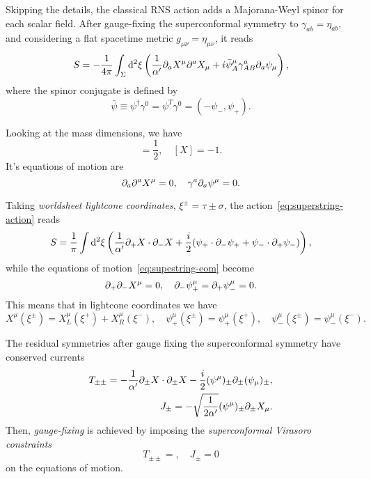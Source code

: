 Skipping the details, the classical RNS action adds a Majorana-Weyl spinor for each scalar field. After gauge-fixing the superconformal symmetry to $\gamma_{ab} = \eta_{ab}$, and considering a flat spacetime metric $g_{\mu\nu} = \eta_{\mu\nu}$, it reads
\begin{equation}\label{eq:superstring-action}
    S = -\frac{1}{4\pi} \int_\Sigma \mathop{}\!\mathrm{d}^2 \xi \left( \frac{1}{\alpha'} \partial_a X^\mu \partial^a X_\mu + i \bar{\psi}^\mu_A \gamma^a_{AB} \partial_a \psi_\mu \right),
\end{equation}
where the spinor conjugate is defined by
\begin{equation}
    \bar{\psi} \equiv \psi^\dagger \gamma^0 = \psi^T \gamma^0 = (-\psi_-, \psi_+).
\end{equation}

Looking at the mass dimensions, we have
\begin{equation}
     [\psi] = \frac{1}{2}, \quad [X] = -1 .
\end{equation}
It's equations of motion are
\begin{equation}\label{eq:supestring-eom}
    \partial_a \partial^a X^\mu = 0, \quad \gamma^a \partial_a \psi^\mu = 0.
\end{equation}

Taking \emph{worldsheet lightcone coordinates}, $\xi^\pm = \tau \pm \sigma$, the action~\eqref{eq:superstring-action} reads
\begin{equation}
    S = \frac{1}{\pi} \int \mathop{}\!\mathrm{d}^2 \xi \left( \frac{1}{\alpha'} \partial_+ X \cdot \partial_- X + \frac{i}{2} (\psi_+ \cdot \partial_- \psi_+ + \psi_- \cdot \partial_+ \psi_-) \right) ,
\end{equation}
while the equations of motion~\eqref{eq:supestring-eom} become
\begin{equation}\label{eq:superstring-lightcone-eom}
    \partial_+ \partial_- X^\mu = 0, \quad \partial_- \psi^\mu_+ = \partial_+ \psi^\mu_- = 0 .
\end{equation}
This means that in lightcone coordinates we have 
\begin{equation}\label{eq:ligthcone-coordinates-split}
    X^\mu (\xi^\pm) = X^\mu_L (\xi^+) + X^\mu_R(\xi^-), \quad \psi^\mu_+ (\xi^\pm) = \psi^\mu_+ (\xi^+), \quad \psi^\mu_- (\xi^\pm) = \psi^\mu_- (\xi^-) .
\end{equation}

The residual symmetries after gauge fixing the superconformal symmetry have conserved currents
\begin{equation}
\begin{aligned}
    T_{\pm\pm} = -\frac{1}{\alpha'} \partial_\pm X \cdot \partial_\pm X - \frac{i}{2} (\psi^\mu)_\pm \partial_\pm (\psi_\mu)_\pm , \\
    J_\pm = - \sqrt{\frac{1}{2\alpha'}} (\psi^\mu)_\pm \partial_\pm X_\mu.
\end{aligned}
\end{equation}
Then, \emph{gauge-fixing} is achieved by imposing the \emph{superconformal Virasoro constraints}
\begin{equation}
    T_{\pm\pm} = , \quad J_{\pm} = 0
\end{equation}
on the equations of motion. 

